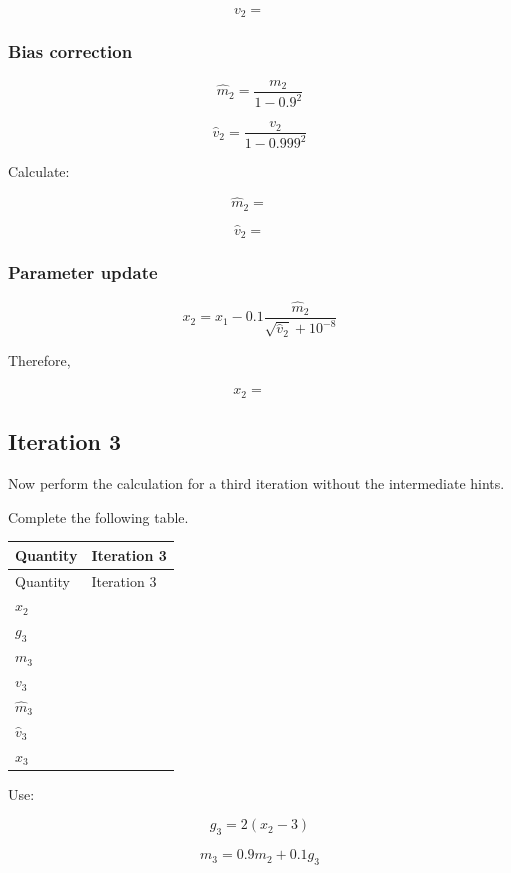 \documentclass{course_sheet}
\begin{document}
\[
v_2 = {\phantom{000}}
\]

\subsubsection*{Bias correction}
\[
\hat m_2 =
\frac{m_2}{1-0.9^2}
\]

\[
\hat v_2 =
\frac{v_2}{1-0.999^2}
\]

Calculate:

\[
\hat m_2 = {\phantom{000}}
\]

\[
\hat v_2 = {\phantom{000}}
\]

\subsubsection*{Parameter update}
\[
x_2 =
x_1 -
0.1
\frac{\hat m_2}
{\sqrt{\hat v_2}+10^{-8}}
\]

Therefore,

\[
x_2 = {\phantom{000}}
\]

\clearpage
\subsection*{Iteration 3}
Now perform the calculation for a third iteration without the intermediate hints.

Complete the following table.

\begingroup
\small
\setlength{\tabcolsep}{4pt}
\begin{longtable}{l|l}
Quantity & Iteration 3 \\[1.5pt]
\hline
\endfirsthead
Quantity & Iteration 3 \\[1.5pt]
\hline
\endhead
\rule{0pt}{2.4ex}$x_2$ &  $\phantom{-0.00}$ \\[3pt]
\rule{0pt}{2.4ex}$g_3$ &  $\phantom{-0.00}$ \\[3pt]
\rule{0pt}{2.4ex}$m_3$ &  $\phantom{-0.00}$ \\[3pt]
\rule{0pt}{2.4ex}$v_3$ &  $\phantom{-0.00}$ \\[3pt]
\rule{0pt}{2.4ex}$\hat m_3$ &  $\phantom{-0.00}$ \\[3pt]
\rule{0pt}{2.4ex}$\hat v_3$ &  $\phantom{-0.00}$ \\[3pt]
\rule{0pt}{2.4ex}$x_3$ &  $\phantom{-0.00}$ \\[3pt]
\end{longtable}
\endgroup
Use:

\[
g_3 = 2(x_2-3)
\]

\[
m_3 = 0.9m_2+0.1g_3
\]
\end{document}
